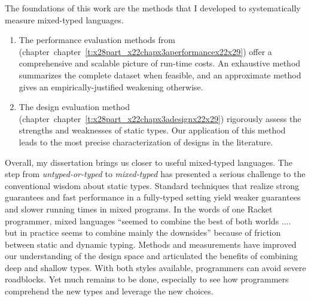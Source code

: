 \documentclass[ twoside,open=right,titlepage,numbers=noenddot,headinclude,%
                footinclude=true,cleardoublepage=empty,abstract=off,
                BCOR=5mm,paper=a4,fontsize=11pt,%
                ngerman,american,%
                parts,pdfspacing]{scrreprt}
\newcommand{\postDoc}{}
\newcommand{\ChapRef}[2]{\SecRef{#1}{#2}}
\newcommand{\SecRef}[2]{section~#1}
\newcommand{\ChapRefLocal}[3]{\hyperref[#1]{\ChapRef{#2}{#3}}}
\newlength{\stabLeft}
\newcommand{\atItemizeStart}[0]{\addtolength{\stabLeft}{\labelsep}
                                \addtolength{\stabLeft}{\labelwidth}}
\renewcommand{\ChapRefLocal}[3]{chapter~\ref{#1}}
\begin{document}
The foundations of this work are the methods that I developed to systematically
 measure mixed{-}typed languages.


\noindent \begin{enumerate}\atItemizeStart

\item The performance evaluation methods from (chapter~\ChapRefLocal{t:x28part_x22chapx3aperformancex22x29}{3}{Performance Analysis Method}) offer a comprehensive
 and scalable picture of run{-}time costs.
An exhaustive method summarizes the complete dataset when feasible, and an
 approximate method gives an empirically{-}justified weakening otherwise.

\item The design evaluation method (chapter~\ChapRefLocal{t:x28part_x22chapx3adesignx22x29}{4}{Design Analysis Method}) rigorously assess the strengths
 and weaknesses of static types.
Our application of this method leads to the most precise
 characterization of designs in the literature.\end{enumerate}

Overall, my dissertation brings us closer to useful mixed{-}typed languages.
The step from \emph{untyped{-}or{-}typed} to \emph{mixed{-}typed} has presented a
 serious challenge to the conventional wisdom about static types.
Standard techniques that realize strong guarantees and fast performance in a fully{-}typed
 setting yield weaker guarantees and slower running times in mixed programs.
In the words of one Racket programmer, mixed languages {``}seemed to combine the
 best of both worlds .... but in practice seems to combine mainly the
 downsides{''} because of friction between static and dynamic typing.
Methods and measurements have improved our understanding of the design space
 and articulated the benefits of combining deep and shallow
 types.
With both styles available, programmers can avoid severe roadblocks.
Yet much remains to be done, especially to see how programmers comprehend
 the new types and leverage the new choices.

\relax{}

\postDoc
\end{document}
